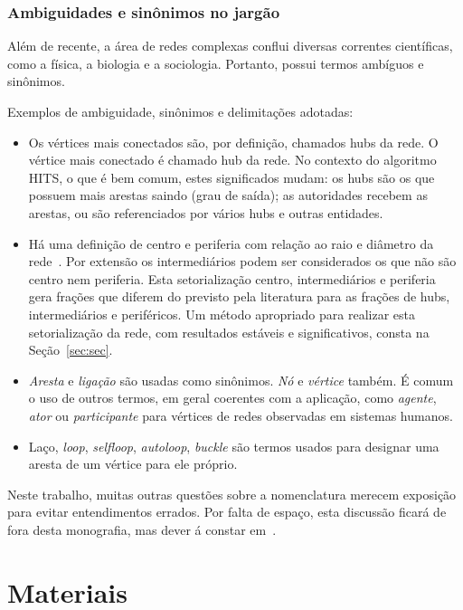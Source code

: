 \documentclass[a4paper,openright,12pt]{report} %
\begin{document}
\subsection{Ambiguidades e sinônimos no jargão}\label{sec:jar}
Além de recente, a área de redes complexas conflui diversas 
correntes científicas, como a física, a biologia e a sociologia.
Portanto, possui termos ambíguos e sinônimos.

Exemplos de ambiguidade, sinônimos e delimitações adotadas:
\begin{itemize}
    \item Os vértices mais conectados são, por definição, chamados hubs da rede. O vértice mais conectado é chamado hub da rede. No contexto do algoritmo HITS, o que é bem comum, estes significados mudam: os hubs são os que possuem mais arestas saindo (grau de saída); as autoridades recebem as arestas, ou são referenciados por vários hubs e outras entidades.
    \item Há uma definição de centro e periferia com relação ao raio e diâmetro da rede~\cite{newmanBook,networkX}.
        Por extensão os intermediários podem ser considerados os que não são centro nem periferia.
        Esta setorialização centro, intermediários e periferia gera frações que diferem do previsto pela literatura para as frações de hubs, intermediários e periféricos.
        Um método apropriado para realizar esta setorialização da rede, com resultados estáveis e significativos, consta na Seção~\ref{sec:sec}.
    \item \emph{Aresta} e \emph{ligação} são usadas como sinônimos. \emph{Nó} e \emph{vértice} também. É comum o uso de outros termos, em geral coerentes com a aplicação, como \emph{agente}, \emph{ator} ou \emph{participante} para vértices de redes observadas em sistemas humanos.
    \item Laço, \emph{loop}, \emph{selfloop}, \emph{autoloop}, \emph{buckle} são termos usados para designar uma aresta de um vértice para ele próprio.
\end{itemize}

Neste trabalho, muitas outras questões sobre a nomenclatura
merecem exposição para evitar entendimentos errados. Por falta
de espaço, esta discussão ficará de fora desta monografia, mas dever
á constar em~\cite{gradus}.

\chapter{Materiais}\label{sec:mat}
\end{document}
